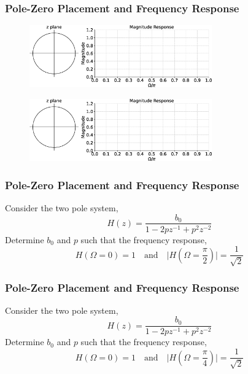 \documentclass[aspectratio=169]{beamer}
\begin{document}
\begin{frame}[t]
  \frametitle{Pole-Zero Placement and Frequency Response}
  \begin{figure}
  \centering
  \includegraphics[width=0.7\textwidth]{img/freqpz.eps}
  \end{figure}

  \begin{figure}
  \centering
  \includegraphics[width=0.7\textwidth]{img/freqpz.eps}
  \end{figure}
\end{frame}


\begin{frame}[t]
  \frametitle{Pole-Zero Placement and Frequency Response}
  Consider the two pole system,
  \[ H(z) = \frac{b_0}{1 - 2pz^{-1} + p^2z^{-2}} \]
  Determine $b_0$ and $p$ such that the frequency response,
   \[ H(\Omega = 0) = 1 \quad \text{and} \quad \big \vert H(\Omega = \frac{\pi}{2}) \big \vert = \frac{1}{\sqrt{2}} \]
\end{frame}


\begin{frame}[t]
  \frametitle{}
  
\end{frame}


\begin{frame}[t]
  \frametitle{Pole-Zero Placement and Frequency Response}
  Consider the two pole system,
  \[ H(z) = \frac{b_0}{1 - 2pz^{-1} + p^2z^{-2}} \]
  Determine $b_0$ and $p$ such that the frequency response,
   \[ H(\Omega = 0) = 1 \quad \text{and} \quad \big \vert H(\Omega = \frac{\pi}{4}) \big \vert = \frac{1}{\sqrt{2}} \]
\end{frame}


\begin{frame}[t]
  \frametitle{}
  
\end{frame}
\end{document}
